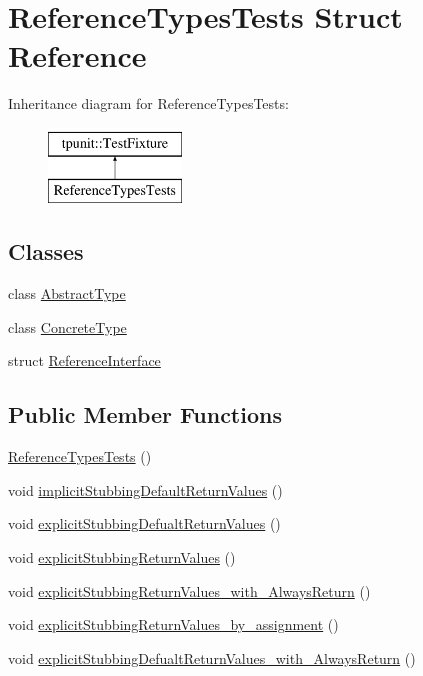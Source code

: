 \hypertarget{structReferenceTypesTests}{}\section{Reference\+Types\+Tests Struct Reference}
\label{structReferenceTypesTests}
Inheritance diagram for Reference\+Types\+Tests\+:\begin{figure}[H]
\begin{center}
\leavevmode
\includegraphics[height=2.000000cm]{structReferenceTypesTests}
\end{center}
\end{figure}
\subsection*{Classes}
\begin{DoxyCompactItemize}
\item 
class \mbox{\hyperlink{classReferenceTypesTests_1_1AbstractType}{Abstract\+Type}}
\item 
class \mbox{\hyperlink{classReferenceTypesTests_1_1ConcreteType}{Concrete\+Type}}
\item 
struct \mbox{\hyperlink{structReferenceTypesTests_1_1ReferenceInterface}{Reference\+Interface}}
\end{DoxyCompactItemize}
\subsection*{Public Member Functions}
\begin{DoxyCompactItemize}
\item 
\mbox{\hyperlink{structReferenceTypesTests_a28a4d021a5a34db5eaf2a81a2a634d02}{Reference\+Types\+Tests}} ()
\item 
void \mbox{\hyperlink{structReferenceTypesTests_a8bb0299b4636688692937d136c5e2d06}{implicit\+Stubbing\+Default\+Return\+Values}} ()
\item 
void \mbox{\hyperlink{structReferenceTypesTests_ac2ab9b60d401bb98802a9fdb4908f775}{explicit\+Stubbing\+Defualt\+Return\+Values}} ()
\item 
void \mbox{\hyperlink{structReferenceTypesTests_a825ffc6273216b00c61782907df00bca}{explicit\+Stubbing\+Return\+Values}} ()
\item 
void \mbox{\hyperlink{structReferenceTypesTests_a7ed10950eea26a97a5463dd6bd487b62}{explicit\+Stubbing\+Return\+Values\+\_\+with\+\_\+\+Always\+Return}} ()
\item 
void \mbox{\hyperlink{structReferenceTypesTests_a7fc45e731139d42b2a599fb148f7a094}{explicit\+Stubbing\+Return\+Values\+\_\+by\+\_\+assignment}} ()
\item 
void \mbox{\hyperlink{structReferenceTypesTests_a33f1b12bc224e61a0581a2420ac060af}{explicit\+Stubbing\+Defualt\+Return\+Values\+\_\+with\+\_\+\+Always\+Return}} ()
\end{DoxyCompactItemize}
